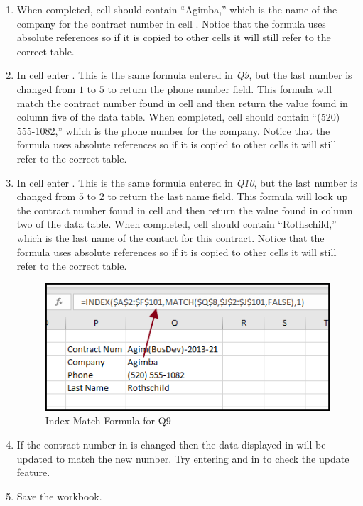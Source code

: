 \begin{enumbox}
\begin{enumerate}
		\item When completed, cell  should contain ``Agimba,'' which is the name of the company for the contract number in cell . Notice that the formula uses absolute references so if it is copied to other cells it will still refer to the correct table.
		\item In cell  enter . This is the same formula entered in \textit{Q9}, but the last number is changed from $ 1 $ to $ 5 $ to return the phone number field. This formula will match the contract number found in cell  and then return the value found in column five of the data table. When completed, cell  should contain ``(520) 555-1082,'' which is the phone number for the company.  Notice that the formula uses absolute references so if it is copied to other cells it will still refer to the correct table. 
		\item In cell  enter . This is the same formula entered in \textit{Q10}, but the last number is changed from $ 5 $ to $ 2 $ to return the last name field. This formula will look up the contract number found in cell  and then return the value found in column two of the data table. When completed, cell  should contain ``Rothschild,'' which is the last name of the contact for this contract.  Notice that the formula uses absolute references so if it is copied to other cells it will still refer to the correct table. 
		
		\begin{figure}[H]
			\centering
			\includegraphics[width=\maxwidth{.95\linewidth}]{gfx/ch09_fig37}
			\caption{Index-Match Formula for Q9}
			\label{09:fig37}
		\end{figure}
		
		\item If the contract number in  is changed then the data displayed in  will be updated to match the new number. Try entering  and  in  to check the update feature.
		\item Save the  workbook.
			
	\end{enumerate}
\end{enumbox}
	
